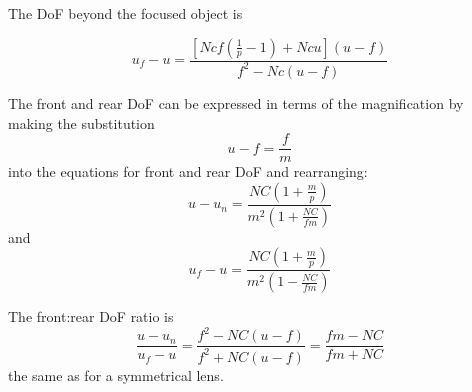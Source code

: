 \documentclass[11pt, oneside]{scrartcl}   	%
\begin{document}

The DoF beyond the focused object is

\begin{equation}
u_f-u=\frac{\left[Ncf\left(\frac 1 p -1\right) + Ncu\right](u-f)}{f^2-Nc(u-f)}
   \label{eq:dofbfo}
\end{equation}

The front and rear DoF can be expressed in terms of the magnification by making the substitution
\begin{equation}
u-f = \frac f m
\end{equation}
 into the equations for front and rear DoF and rearranging:
\begin{equation}
u-u_n = \frac{NC\left(1+ \frac m p\right)}{m^2\left(1+\frac{NC}{fm}\right)}
\end{equation}
and
\begin{equation}
u_f-u = \frac{NC\left(1+ \frac m p\right)}{m^2\left(1-\frac{NC}{fm}\right)}
\end{equation}

The front:rear DoF ratio is 
\begin{equation}
   \frac{u - u_n}{u_f-u} =  \frac{f^2 - NC(u-f)}{f^2 + NC(u-f)} = \frac{fm - NC}{fm + NC}
   \label{eq:frdofratio}
\end{equation}
the same as for a symmetrical lens.
\end{document}
